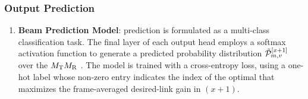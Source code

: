 \documentclass[conference, a4paper]{IEEEtran}
\newcommand{\rev}[1]{\textcolor{revisioncolor}{{}#1}}
\newif\ifshowdeletions
\newcommand{\currentdel}[1]{\ifshowdeletions\textcolor{deletioncolor}{\sout{#1}}\fi}
\theoremstyle{remark}
\begin{document}
\subsubsection{Output Prediction}

\currentdel{Although the beam-pair and channel-gain prediction share the same NN architecture, they are implemented as distinct models with independently trained weights:}
\begin{enumerate}[label=\arabic*.]
    \item \textbf{Beam Prediction Model}: \currentdel{The optimal beam-pair} prediction is formulated as a multi-class classification task. The final layer of each output head employs a softmax activation function to generate a predicted probability distribution $\Tilde{\mathcal{P}}_{m,v}^{[x+1]}$ over the $M_{\rm T}M_{\rm R}$ \currentdel{beam-pairs}.
    The model is trained with a cross-entropy loss, using a one-hot label whose non-zero entry indicates the index of the optimal \currentdel{beam-pair} that
    maximizes the \rev{frame-averaged }desired-link gain in \currentdel{frame-}$(x\!+\!1)$.
    

\end{enumerate}
\end{document}
